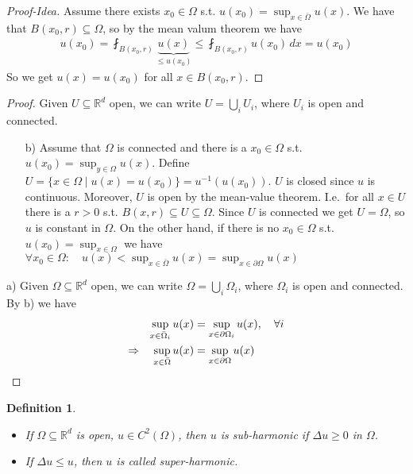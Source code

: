 \documentclass{report}
\theoremstyle{tommy}
\newtheorem{defn}{Definition}
\begin{document}
\begin{proof}[Proof-Idea]
  Assume there exists \(x_0 \in \Omega\) s.t. \(u(x_0) = \sup_{x \in \bar \Omega} u(x)\). We have that \(B(x_0, r) \subseteq \Omega\), so by the mean valum theorem we have
  \begin{align*}
    u(x_0) 
    = \fint_{B(x_0, r)} \underbrace{u(x)}_{\le u(x_0)}
    \le \fint_{B(x_0, r)} u(x_0) \, dx = u(x_0)
  \end{align*}
  So we get \(u(x) = u(x_0)\) for all \(x \in B(x_0, r)\).
\end{proof}

\begin{proof}
  Given \(U \subseteq \mathbb{R}^d\) open, we can write \(U = \bigcup_i U_i\), where \(U_i\) is open and connected.
  \begin{enumerate}
    \item[b)] Assume that \(\Omega\) is connected and there is a \(x_0 \in \Omega\) s.t. \(u(x_0) = \sup_{y \in \Omega} u(x)\). Define \(U = \{ x \in \Omega \mid u(x) = u(x_0)\} = u^{-1}(u(x_0))\). \(U\) is closed since \(u\) is continuous.
    Moreover, \(U\) is open by the mean-value theorem. I.e.~for all \(x \in U\) there is a \(r > 0\) s.t. \(B(x,r) \subseteq U \subseteq \Omega\).
    Since \(U\) is connected we get \(U = \Omega\), so \(u\) is constant in \(\Omega\). On the other hand, if there is no \(x_0 \in \Omega\) s.t. \(u(x_0) = \sup_{x \in \Omega}\) we have \(\forall x_0 \in \Omega: \quad u(x) < \sup_{x \in \bar \Omega} u(x) = \sup_{x \in \partial \Omega} u(x)\)
  \end{enumerate}
  a) Given \(\Omega \subseteq \mathbb{R}^d\) open, we can write \(\Omega = \bigcup_i \Omega_i\), where \(\Omega_i\) is open and connected. By b) we have \begin{align*}
    \sup_{x \in \bar \Omega_i} u(x) &= \sup_{x \in \partial \Omega_i} u(x), \quad \forall i \\
    \Rightarrow \quad \sup_{x \in \bar \Omega} u(x) &= \sup_{x \in \partial \Omega} u(x) \qedhere
  \end{align*}
\end{proof}

\begin{defn}
  \begin{itemize}
    \item If \(\Omega \subseteq \mathbb{R}^d\) is open, \(u \in C^2(\Omega)\), then \(u\) is \emph{sub-harmonic} if \(\Delta u \ge 0\) in \(\Omega\).
    \item If \(\Delta u \le u\), then \(u\) is called \emph{super-harmonic}.
  \end{itemize}
\end{defn}
\end{document}
